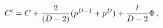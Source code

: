 \begin{equation}
\label{Dweyl} C^\prime=C+{2\over (D-2)}(p^{D-1}+p^D) +{l\over D-2}\Phi
\, ,
\end{equation} 
